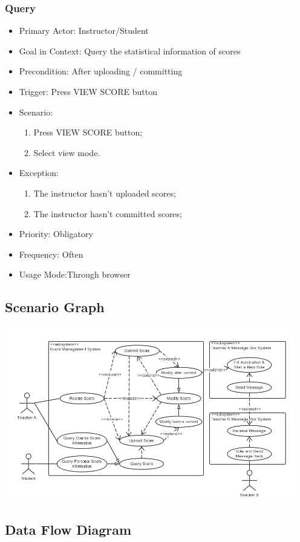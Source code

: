 \documentclass[a4]{article}
\begin{document}
\subsubsection{Query}
\begin{itemize}
\item Primary Actor: Instructor/Student
\item Goal in Context: Query the statistical information of scores
\item Precondition: After uploading / committing
\item Trigger: Press VIEW SCORE button
\item Scenario:
\begin{enumerate}
\item Press VIEW SCORE button;
\item Select view mode.
\end{enumerate}
\item Exception:
\begin{enumerate}
\item The instructor hasn’t uploaded scores;
\item The instructor hasn’t committed scores;
\end{enumerate}

\item Priority: Obligatory
\item Frequency: Often
\item Usage Mode:Through browser
\end{itemize}
\subsection{Scenario Graph}
\includegraphics[width=5in]{pic/1.png}
\subsection{Data Flow Diagram}
\end{document}
